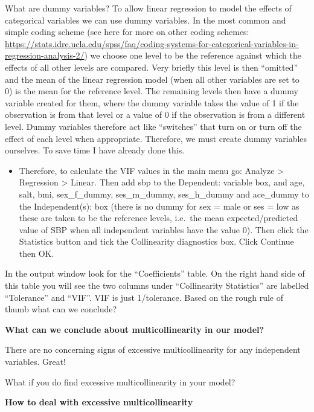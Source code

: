 \documentclass[
]{book}
\providecommand{\tightlist}{%
  \setlength{\itemsep}{0pt}\setlength{\parskip}{0pt}}
\begin{document}
What are dummy variables? To allow linear regression to model the effects of categorical variables we can use dummy variables. In the most common and simple coding scheme (see here for more on other coding schemes: \url{https://stats.idre.ucla.edu/spss/faq/coding-systems-for-categorical-variables-in-regression-analysis-2/}) we choose one level to be the reference against which the effects of all other levels are compared. Very briefly this level is then ``omitted'' and the mean of the linear regression model (when all other variables are set to 0) is the mean for the reference level. The remaining levels then have a dummy variable created for them, where the dummy variable takes the value of 1 if the observation is from that level or a value of 0 if the observation is from a different level. Dummy variables therefore act like ``switches'' that turn on or turn off the effect of each level when appropriate. Therefore, we must create dummy variables ourselves. To save time I have already done this.

\begin{itemize}
\tightlist
\item
  Therefore, to calculate the VIF values in the main menu go: Analyze \textgreater{} Regression \textgreater{} Linear. Then add sbp to the Dependent: variable box, and age, salt, bmi, sex\_f\_dummy, ses\_m\_dummy, ses\_h\_dummy and ace\_dummy to the Independent(s): box (there is no dummy for sex = male or ses = low as these are taken to be the reference levels, i.e.~the mean expected/predicted value of SBP when all independent variables have the value 0). Then click the Statistics button and tick the Collinearity diagnostics box. Click Continue then OK.
\end{itemize}

In the output window look for the ``Coefficients'' table. On the right hand side of this table you will see the two columns under ``Collinearity Statistics'' are labelled ``Tolerance'' and ``VIF''. VIF is just 1/tolerance. Based on the rough rule of thumb what can we conclude?

\textbf{What can we conclude about multicollinearity in our model?}

There are no concerning signs of excessive multicollinearity for any independent variables. Great!

What if you do find excessive multicollinearity in your model?

\textbf{How to deal with excessive multicollinearity}
\end{document}
